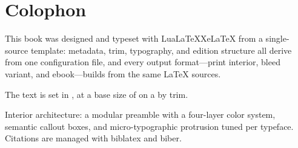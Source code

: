 \chapter{Colophon}

\noindent This book was designed and typeset with
\ifluatex Lua\LaTeX\else Xe\LaTeX\fi{} from a single-source template:
metadata, trim, typography, and edition structure all derive from one
configuration file, and every output format---print interior, bleed
variant, and ebook---builds from the same LaTeX sources.

\medskip

\noindent The text is set in
%
%
%
, at a base size of \BookBaseSize{} on a \BookTrimWidth{} by
\BookTrimHeight{} trim.

\medskip

\noindent Interior architecture: a modular preamble with a four-layer
color system, semantic callout boxes, and micro-typographic protrusion
tuned per typeface. Citations are managed with biblatex and biber.

\bigskip

\noindent\textit{\BookPublisher\ \textperiodcentered\ \BookYear}
